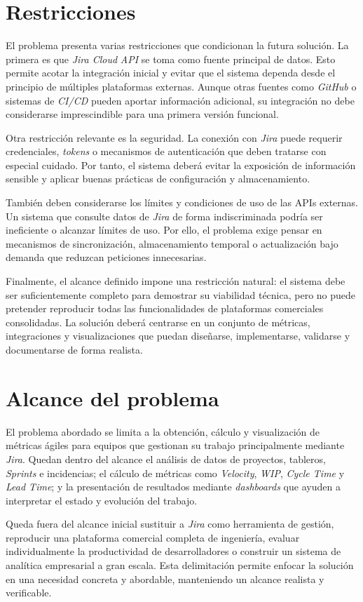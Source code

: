 \section{Restricciones}

El problema presenta varias restricciones que condicionan la futura solución. La primera es que \textit{Jira Cloud} \textit{API} se toma como fuente principal de datos. Esto permite acotar la integración inicial y evitar que el sistema dependa desde el principio de múltiples plataformas externas. Aunque otras fuentes como \textit{GitHub} o sistemas de \textit{CI/CD} pueden aportar información adicional, su integración no debe considerarse imprescindible para una primera versión funcional.

Otra restricción relevante es la seguridad. La conexión con \textit{Jira} puede requerir credenciales, \textit{tokens} o mecanismos de autenticación que deben tratarse con especial cuidado. Por tanto, el sistema deberá evitar la exposición de información sensible y aplicar buenas prácticas de configuración y almacenamiento.

También deben considerarse los límites y condiciones de uso de las APIs externas. Un sistema que consulte datos de \textit{Jira} de forma indiscriminada podría ser ineficiente o alcanzar límites de uso. Por ello, el problema exige pensar en mecanismos de sincronización, almacenamiento temporal o actualización bajo demanda que reduzcan peticiones innecesarias.

Finalmente, el alcance definido impone una restricción natural: el sistema debe ser suficientemente completo para demostrar su viabilidad técnica, pero no puede pretender reproducir todas las funcionalidades de plataformas comerciales consolidadas. La solución deberá centrarse en un conjunto de métricas, integraciones y visualizaciones que puedan diseñarse, implementarse, validarse y documentarse de forma realista.

\section{Alcance del problema}

El problema abordado se limita a la obtención, cálculo y visualización de métricas ágiles para equipos que gestionan su trabajo principalmente mediante \textit{Jira}. Quedan dentro del alcance el análisis de datos de proyectos, tableros, \textit{Sprints} e incidencias; el cálculo de métricas como \textit{Velocity}, \textit{WIP}, \textit{Cycle Time} y \textit{Lead Time}; y la presentación de resultados mediante \textit{dashboards} que ayuden a interpretar el estado y evolución del trabajo.

Queda fuera del alcance inicial sustituir a \textit{Jira} como herramienta de gestión, reproducir una plataforma comercial completa de ingeniería, evaluar individualmente la productividad de desarrolladores o construir un sistema de analítica empresarial a gran escala. Esta delimitación permite enfocar la solución en una necesidad concreta y abordable, manteniendo un alcance realista y verificable.
